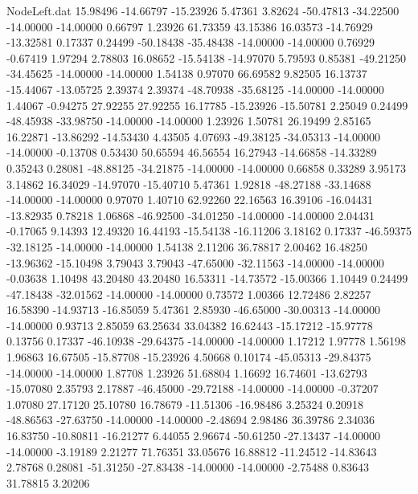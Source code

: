 \begin{filecontents}{NodeLeft.dat}
  15.98496  -14.66797  -15.23926     5.47361    3.82624  -50.47813  -34.22500  -14.00000  -14.00000    0.66797    1.23926   61.73359   43.15386
  16.03573  -14.76929  -13.32581     0.17337    0.24499  -50.18438  -35.48438  -14.00000  -14.00000    0.76929   -0.67419    1.97294    2.78803
  16.08652  -15.54138  -14.97070     5.79593    0.85381  -49.21250  -34.45625  -14.00000  -14.00000    1.54138    0.97070   66.69582    9.82505
  16.13737  -15.44067  -13.05725     2.39374    2.39374  -48.70938  -35.68125  -14.00000  -14.00000    1.44067   -0.94275   27.92255   27.92255
  16.17785  -15.23926  -15.50781     2.25049    0.24499  -48.45938  -33.98750  -14.00000  -14.00000    1.23926    1.50781   26.19499    2.85165
  16.22871  -13.86292  -14.53430     4.43505    4.07693  -49.38125  -34.05313  -14.00000  -14.00000   -0.13708    0.53430   50.65594   46.56554
  16.27943  -14.66858  -14.33289     0.35243    0.28081  -48.88125  -34.21875  -14.00000  -14.00000    0.66858    0.33289    3.95173    3.14862
  16.34029  -14.97070  -15.40710     5.47361    1.92818  -48.27188  -33.14688  -14.00000  -14.00000    0.97070    1.40710   62.92260   22.16563
  16.39106  -16.04431  -13.82935     0.78218    1.06868  -46.92500  -34.01250  -14.00000  -14.00000    2.04431   -0.17065    9.14393   12.49320
  16.44193  -15.54138  -16.11206     3.18162    0.17337  -46.59375  -32.18125  -14.00000  -14.00000    1.54138    2.11206   36.78817    2.00462
  16.48250  -13.96362  -15.10498     3.79043    3.79043  -47.65000  -32.11563  -14.00000  -14.00000   -0.03638    1.10498   43.20480   43.20480
  16.53311  -14.73572  -15.00366     1.10449    0.24499  -47.18438  -32.01562  -14.00000  -14.00000    0.73572    1.00366   12.72486    2.82257
  16.58390  -14.93713  -16.85059     5.47361    2.85930  -46.65000  -30.00313  -14.00000  -14.00000    0.93713    2.85059   63.25634   33.04382
  16.62443  -15.17212  -15.97778     0.13756    0.17337  -46.10938  -29.64375  -14.00000  -14.00000    1.17212    1.97778    1.56198    1.96863
  16.67505  -15.87708  -15.23926     4.50668    0.10174  -45.05313  -29.84375  -14.00000  -14.00000    1.87708    1.23926   51.68804    1.16692
  16.74601  -13.62793  -15.07080     2.35793    2.17887  -46.45000  -29.72188  -14.00000  -14.00000   -0.37207    1.07080   27.17120   25.10780
  16.78679  -11.51306  -16.98486     3.25324    0.20918  -48.86563  -27.63750  -14.00000  -14.00000   -2.48694    2.98486   36.39786    2.34036
  16.83750  -10.80811  -16.21277     6.44055    2.96674  -50.61250  -27.13437  -14.00000  -14.00000   -3.19189    2.21277   71.76351   33.05676
  16.88812  -11.24512  -14.83643     2.78768    0.28081  -51.31250  -27.83438  -14.00000  -14.00000   -2.75488    0.83643   31.78815    3.20206

\end{filecontents}
